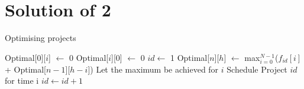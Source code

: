 \documentclass[a4paper,10pt]{article}
\begin{document}
\section{Solution of 2}
\begin{algorithm}
 \caption{Optimising projects}
 \begin{algorithmic}
     \State Optimal[$0$][$i$] $\gets$ 0
    \EndFor
     \State Optimal[$i$][$0$] $\gets$ 0
    \EndFor
    \State $id \gets$ 1
      \State Optimal[$n$][$h$] $\gets$ max$_{i=0}^{N-1}$($f_{id}[i]$ + Optimal[$n-1$][$h-i$])
      \State Let the maximum be achieved for $i$
      \State Schedule Project $id$ for time i
      \State $id \gets id + 1$
     \EndFor
    \EndFor
  \EndFunction
 \end{algorithmic}
\end{algorithm}
\end{document}
